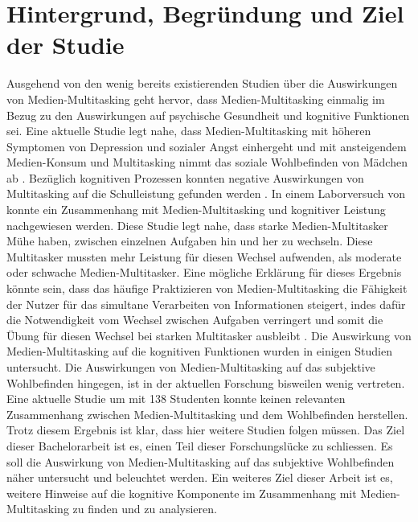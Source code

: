 \section{Hintergrund, Begründung und Ziel der Studie}\label{section.einleitung.hintergrund}
Ausgehend von den wenig bereits existierenden Studien über die Auswirkungen von Medien-Multitasking geht hervor, dass Medien-Multitasking einmalig im Bezug zu den Auswirkungen auf psychische Gesundheit und kognitive Funktionen sei. Eine aktuelle Studie legt nahe, dass Medien-Multitasking mit höheren Symptomen von Depression und sozialer Angst einhergeht \cite{Becker2013} und mit ansteigendem Medien-Konsum und Multitasking nimmt das soziale Wohlbefinden von Mädchen ab \cite{Pea2012}. Bezüglich kognitiven Prozessen konnten negative Auswirkungen von Multitasking auf die Schulleistung gefunden werden \cite{Junco2012}. In einem Laborversuch von  konnte ein Zusammenhang mit Medien-Multitasking und kognitiver Leistung nachgewiesen werden. Diese Studie legt nahe, dass starke Medien-Multitasker Mühe haben, zwischen einzelnen Aufgaben hin und her zu wechseln. Diese Multitasker mussten mehr Leistung für diesen Wechsel aufwenden, als moderate oder schwache Medien-Multitasker. Eine mögliche Erklärung für dieses Ergebnis könnte sein, dass das häufige Praktizieren von Medien-Multitasking die Fähigkeit der Nutzer für das simultane Verarbeiten von Informationen steigert, indes dafür die Notwendigkeit vom Wechsel zwischen Aufgaben verringert und somit die Übung für diesen Wechsel bei starken Multitasker ausbleibt \cite{Alzahabi2013, Watson2010}. Die Auswirkung von Medien-Multitasking auf die kognitiven Funktionen wurden in einigen Studien untersucht. Die Auswirkungen von Medien-Multitasking auf das subjektive Wohlbefinden hingegen, ist in der aktuellen Forschung bisweilen wenig vertreten. Eine aktuelle Studie um  mit 138 Studenten konnte keinen relevanten Zusammenhang zwischen Medien-Multitasking und dem Wohlbefinden herstellen. Trotz diesem Ergebnis ist klar, dass hier weitere Studien folgen müssen. Das Ziel dieser Bachelorarbeit ist es, einen Teil dieser Forschungslücke zu schliessen. Es soll die Auswirkung von Medien-Multitasking auf das subjektive Wohlbefinden näher untersucht und beleuchtet werden. Ein weiteres Ziel dieser Arbeit ist es, weitere Hinweise auf die kognitive Komponente im Zusammenhang mit Medien-Multitasking zu finden und zu analysieren. 

